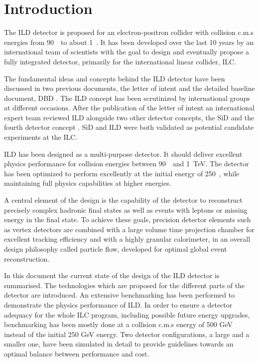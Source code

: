 \chapter{Introduction}
\label{chap:introduction}
The ILD detector is proposed for an electron-positron collider with collision c.m.s energies from 90~\GeV~to about 1~\TeV. It has been developed over the last 10 years by an international team of scientists with the goal to design and eventually propose a fully integrated detector, primarily for the international linear collider, ILC.

The fundamental ideas and concepts behind the ILD detector have been discussed in two previous documents, the letter of intent \cite{ild:bib:ILDloi} and the detailed baseline document, DBD \cite{ild:bib:ilddbd}. 
The ILD concept has been scrutinized by international groups at different occasions. After the publication of the letter of intent \cite{ild:bib:ILDloi} an international expert team reviewed ILD alongside two other detector concepts, the SiD \cite{bib:sid:loi} and the fourth detector concept \cite{bib:4th:loi}. SiD and ILD were both validated as potential candidate experiments at the ILC. 

ILD has been designed as a multi-purpose detector. It should deliver excellent physics performance for collision energies between 90~\GeV~and 1~TeV. The detector has been optimized to perform excellently at the initial  energy of 250~\GeV, while maintaining full physics capabilities at higher energies. 

 A central element of the design is the capability of the detector to reconstruct precisely complex hadronic final states as well as events with leptons or missing energy in the final state. To achieve these goals, precision detector elements such as vertex detectors are combined with a large volume time projection chamber for excellent tracking efficiency and with a highly granular calorimeter, in an overall design philosophy called particle flow, developed for optimal global event reconstruction. 

In this document the current state of the design of the ILD detector is summarised. The technologies which are proposed for the different parts of the detector are introduced. An extensive benchmarking has been performed to demonstrate the physics performance of ILD. In order to ensure a detector adequacy for the whole ILC program, including possible future energy upgrades, benchmarking has been mostly done at a collision c.m.s energy of 500 GeV instead of the initial 250 GeV energy. Two detector configurations, a large and a smaller one, have been simulated in detail to provide guidelines towards an optimal balance between performance and cost. 

